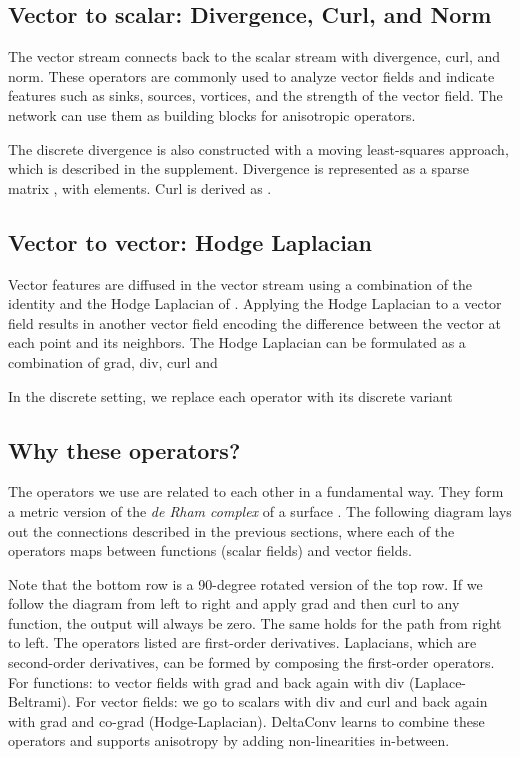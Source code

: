 \documentclass[acmtog, authorversion]{acmart}
\begin{document}
\subsection{Vector to scalar: Divergence, Curl, and Norm}
The vector stream connects back to the scalar stream with divergence, curl, and norm. These operators are commonly used to analyze vector fields and indicate features such as sinks, sources, vortices, and the strength of the vector field. The network can use them as building blocks for anisotropic operators.

The discrete divergence is also constructed with a moving least-squares approach, which is described in the supplement. Divergence is represented as a sparse matrix , with  elements. Curl is derived as .

\subsection{Vector to vector: Hodge Laplacian}
Vector features are diffused in the vector stream using a combination of the identity  and the Hodge Laplacian  of .
Applying the Hodge Laplacian to a vector field  results in another vector field encoding the difference between the vector at each point and its neighbors. The Hodge Laplacian can be formulated as a combination of grad, div, curl and ~\cite{Brandt2017}

In the discrete setting, we replace each operator with its discrete variant


\subsection{Why these operators?}
The operators we use are related to each other in a fundamental way. They form a metric version of the \textit{de Rham complex} of a surface \cite{Wardetzky2006}. The following diagram lays out the connections described in the previous sections, where each of the operators maps between functions (scalar fields) and vector fields.

Note that the bottom row is a 90-degree rotated version of the top row. If we follow the diagram from left to right and apply grad and then curl to any function, the output will always be zero. The same holds for the path from right to left. The operators listed are first-order derivatives. Laplacians, which are second-order derivatives, can be formed by composing the first-order operators. For functions: to vector fields with grad and back again with div (Laplace-Beltrami). For vector fields: we go to scalars with div and curl and back again with grad and co-grad (Hodge-Laplacian). DeltaConv learns to combine these operators and supports anisotropy by adding non-linearities in-between.
\end{document}
